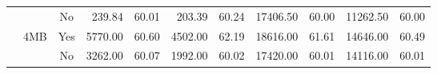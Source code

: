 \documentclass{article}
\begin{document}
\begin{table}[]
\begin{tabular}{@{}cccrrrrrrrr@{}}
                &                       & No                   &  239.84 & 60.01   &  203.39  & 60.24   & 17406.50 & 60.00   & 11262.50  & 60.00  \\
                                               
                & \multirow{2}{*}{4MB}  & Yes                  & 5770.00 & 60.60   & 4502.00  & 62.19   & 18616.00 & 61.61   & 14646.00  & 60.49  \\
                                               
                &                       & No                   & 3262.00 & 60.07   & 1992.00  & 60.02   & 17420.00 & 60.01   & 14116.00  & 60.01  \\
        \bottomrule
    \end{tabular}
\end{table}
\end{document}
